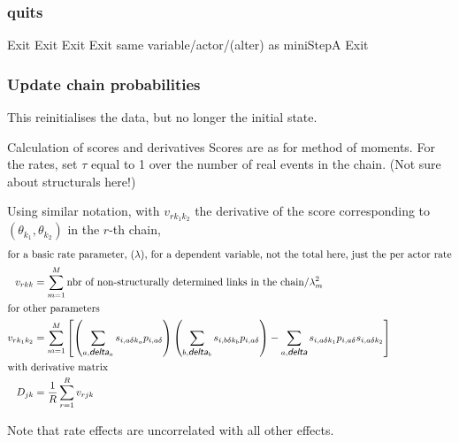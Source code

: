 \documentclass[12pt,a4paper]{article}
\makeatletter
\renewcommand{\=}{\,=\,}
\newcommand{\+}{\,+\,}
\newcommand{\nnm}[1]{\textsf{\small\textit{#1}}}
\renewcommand{\subsection}{\@startsection{subsection}{2}
                {0pt}{0.7\baselineskip}{0.3\baselineskip}
                {\sffamily} }
\makeatother
\begin{document}
\subsubsection{quits}
\label{sec:quit}
\begin{algorithmic}
\STATE Exit
\ENDIF
{}
\STATE Exit
\ENDIF
{}
\STATE Exit
\ENDIF
{}
\STATE Exit
\ENDIF
\IF
{same variable/actor/(alter) as miniStepA}
\STATE Exit
\ENDIF
\end{algorithmic}
\subsubsection{Update chain probabilities}
\label{sec:chprob}
This reinitialises the data, but no longer the initial state.
\subsection{Calculation of scores and derivatives}
\label{sec:scores}
Scores are as for method of moments. For the rates, set $\tau$ equal to 1 over
the number of real events in the chain. (Not sure about structurals here!)

Using similar notation, with $v_{rk_1k_2}$ the derivative of the score
corresponding to$(\theta_{k_1}, \theta_{k_2})$ in the $r$-th chain,
\begin{align*}
\intertext{for a basic rate parameter, $(\lambda)$, for a
dependent variable, not the total here, just the per actor rate}
v_{rkk} &= \sum_{m=1}^M  \textrm{nbr of non-structurally determined links in the
  chain}/ \lambda_m^2\\
\intertext{for other parameters}
v_{rk_1k_2}&= \sum_{m=1}^M \left [  \left( \sum_{a, \nnm{delta}_a}
  s_{i,a\delta k_a} p_{i,a\delta} \right) \left (
\sum_{ b, \nnm{delta}_b} s_{i,b\delta k_b} p_{i,a\delta} \right) -
\sum_{a, \nnm{delta}}
  s_{i,a\delta k_1}p_{i,a\delta}  s_{i,a\delta k_2}
\right ]\\
\intertext{with derivative matrix}
 D_{jk}&=\frac{1}{R}\sum_{r=1}^R v_{rjk}
\end{align*}

Note that rate effects are uncorrelated with all other effects.
\end{document}

